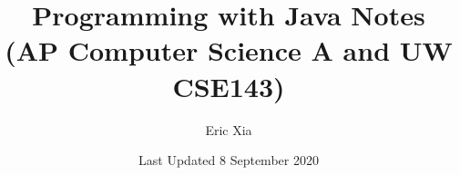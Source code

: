 \documentclass{article}
\title{Programming with Java Notes \\
\large (AP Computer Science A and UW CSE143)
}
\author{Eric Xia}
\date{Last Updated 8 September 2020}
\begin{document}
    \maketitle
    \tableofcontents
    \pagebreak

    
    
\end{document}
